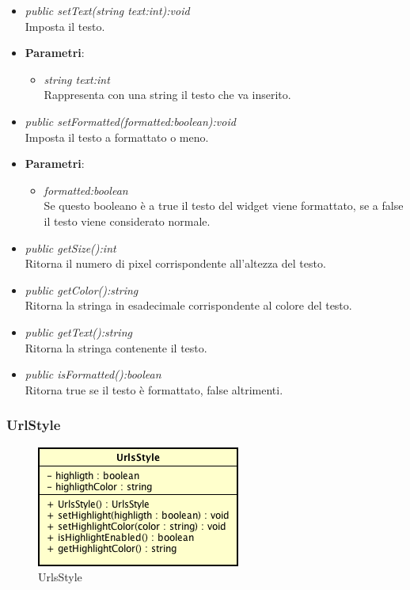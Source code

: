 \begin{itemize}
\begin{itemize}
{\begin{itemize}
		\end{itemize}}
	\item \textit{public setText(string text:int):void}\\
	Imposta il testo.
		\item{\textbf{Parametri}: \begin{itemize}
		\item \textit{string text:int}\\
		Rappresenta con una string il testo che va inserito.
		\end{itemize}}
	\item \textit{public setFormatted(formatted:boolean):void}\\
	Imposta il testo a formattato o meno.
		\item{\textbf{Parametri}: \begin{itemize}
		\item \textit{formatted:boolean}\\
		Se questo booleano è a true il testo del widget viene formattato, se a false il testo viene considerato normale.
		\end{itemize}}
	\item \textit{public getSize():int}\\
	Ritorna il numero di pixel corrispondente all'altezza del testo.
	\item \textit{public getColor():string}\\
	Ritorna  la stringa in esadecimale corrispondente al colore del testo.
	\item \textit{public getText():string}\\
	Ritorna la stringa contenente il testo.
	\item \textit{public isFormatted():boolean}\\
	Ritorna true se il testo è formattato, false altrimenti.
	\end{itemize}
\end{itemize}

\subsubsection{UrlStyle}

\label{UrlsStyle}
\begin{figure}[ht]
	\centering
	\includegraphics[scale=0.5]{Sezioni/SottosezioniST/img/UrlsStyle.png}
	\caption{UrlsStyle}
\end{figure}

